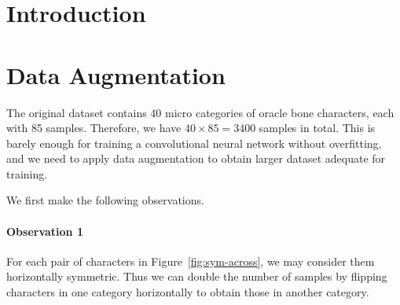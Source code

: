 \documentclass[journal]{IEEEtran}
\begin{document}
\IEEEpeerreviewmaketitle



\section{Introduction}

\section{Data Augmentation}
The original dataset contains 40 micro categories of oracle bone characters, each with 85 samples.
Therefore, we have $40 \times 85 = 3400$ samples in total.
This is barely enough for training a convolutional neural network without overfitting, and we need to apply data augmentation to obtain larger dataset adequate for training.

We first make the following observations.

\paragraph{Observation 1} For each pair of characters in Figure~\ref{fig:sym-across}, we may consider them horizontally symmetric.
Thus we can double the number of samples by flipping characters in one category horizontally to obtain those in another category.
\end{document}
